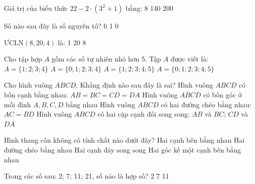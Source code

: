 \documentclass[12pt,a4paper]{article}
\begin{document}
\begin{ex}
Giá trị của biểu thức $22 - 2 \cdot (3^2 + 1)$ bằng:
\choice
{8}
{140}
{200}
{}
\end{ex}

\begin{ex}
Số nào sau đây là số nguyên tố?
\choice
{6}
{1}
{}
{0}
\end{ex}

\begin{ex}
$\text{ƯCLN}(8, 20, 4)$ là:
\choice
{1}
{20}
{}
{8}
\end{ex}

\begin{ex}
Cho tập hợp $A$ gồm các số tự nhiên nhỏ hơn 5. Tập $A$ được viết là:
\choice
{$A = \{1; 2; 3; 4\}$}
{\True $A = \{0; 1; 2; 3; 4\}$}
{$A = \{1; 2; 3; 4; 5\}$}
{$A = \{0; 1; 2; 3; 4; 5\}$}
\end{ex}

\begin{ex}
Cho hình vuông $ABCD$. Khẳng định nào sau đây là sai?
\choice
{Hình vuông $ABCD$ có bốn cạnh bằng nhau: $AB = BC = CD = DA$}
{Hình vuông $ABCD$ có bốn góc ở mỗi đỉnh $A, B, C, D$ bằng nhau}
{Hình vuông $ABCD$ có hai đường chéo bằng nhau: $AC = BD$}
{\True Hình vuông $ABCD$ có hai cặp cạnh đối song song: $AB$ và $BC$; $CD$ và $DA$}
\end{ex}

\begin{ex}
Hình thang cân không có tính chất nào dưới đây?
\choice
{Hai cạnh bên bằng nhau}
{Hai đường chéo bằng nhau}
{Hai cạnh đáy song song}
{\True Hai góc kề một cạnh bên bằng nhau}
\end{ex}

\begin{ex}
Trong các số sau: 2; 7; 11; 21, số nào là hợp số?
\choice
{2}
{7}
{}
{11}
\end{ex}
\end{document}

